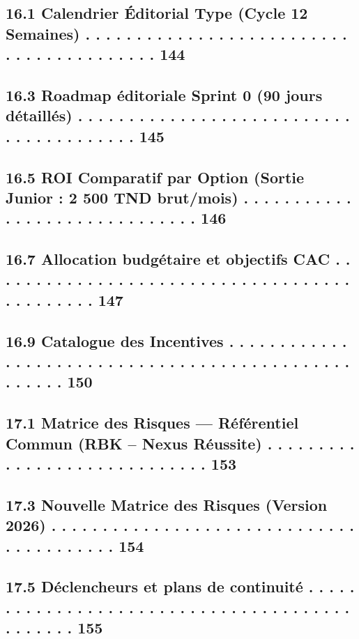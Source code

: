 \documentclass[12pt,landscape,a4paper]{article}
\begin{document}
\subsection{16.1 Calendrier Éditorial Type (Cycle 12 Semaines) . . . . . . . . . . . . . . . . . . . . . . . . . . . . . . . . . . . . . . . . . 144}
\subsection{16.3 Roadmap éditoriale Sprint 0 (90 jours détaillés) . . . . . . . . . . . . . . . . . . . . . . . . . . . . . . . . . . . . . . . . 145}
\subsection{16.5 ROI Comparatif par Option (Sortie Junior : 2 500 TND brut/mois) . . . . . . . . . . . . . . . . . . . . . . . . . . . . . . 146}
\subsection{16.7 Allocation budgétaire et objectifs CAC . . . . . . . . . . . . . . . . . . . . . . . . . . . . . . . . . . . . . . . . . . . . . 147}
\subsection{16.9 Catalogue des Incentives . . . . . . . . . . . . . . . . . . . . . . . . . . . . . . . . . . . . . . . . . . . . . . . . . . . . 150}
\vspace{0.5em}
\subsection{17.1 Matrice des Risques — Référentiel Commun (RBK – Nexus Réussite) . . . . . . . . . . . . . . . . . . . . . . . . . . . . . 153}
\subsection{17.3 Nouvelle Matrice des Risques (Version 2026) . . . . . . . . . . . . . . . . . . . . . . . . . . . . . . . . . . . . . . . . . 154}
\subsection{17.5 Déclencheurs et plans de continuité . . . . . . . . . . . . . . . . . . . . . . . . . . . . . . . . . . . . . . . . . . . . . . 155}
\end{document}
